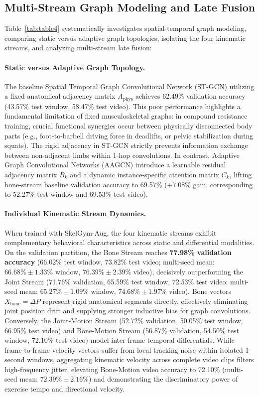 \documentclass[runningheads]{llncs}
\begin{document}
\subsection{Multi-Stream Graph Modeling and Late Fusion}
Table~\ref{tab:table4} systematically investigates spatial-temporal graph modeling, comparing static versus adaptive graph topologies, isolating the four kinematic streams, and analyzing multi-stream late fusion:

\paragraph{Static versus Adaptive Graph Topology.} The baseline Spatial Temporal Graph Convolutional Network (ST-GCN) utilizing a fixed anatomical adjacency matrix $A_{\text{phys}}$ achieves 62.49\% validation accuracy (43.57\% test window, 58.47\% test video). This poor performance highlights a fundamental limitation of fixed musculoskeletal graphs: in compound resistance training, crucial functional synergies occur between physically disconnected body parts (e.g., foot-to-barbell driving force in deadlifts, or pelvic stabilization during squats). The rigid adjacency in ST-GCN strictly prevents information exchange between non-adjacent limbs within 1-hop convolutions. In contrast, Adaptive Graph Convolutional Networks (AAGCN) introduce a learnable residual adjacency matrix $B_k$ and a dynamic instance-specific attention matrix $C_k$, lifting bone-stream baseline validation accuracy to 69.57\% (+7.08\% gain, corresponding to 52.27\% test window and 69.53\% test video).

\paragraph{Individual Kinematic Stream Dynamics.} When trained with SkelGym-Aug, the four kinematic streams exhibit complementary behavioral characteristics across static and differential modalities. On the validation partition, the Bone Stream reaches \textbf{77.98\% validation accuracy} (66.02\% test window, 73.82\% test video; multi-seed mean: $66.68\% \pm 1.33\%$ window, $76.39\% \pm 2.39\%$ video), decisively outperforming the Joint Stream (71.76\% validation, 65.59\% test window, 72.53\% test video; multi-seed mean: $65.27\% \pm 1.09\%$ window, $74.68\% \pm 1.97\%$ video). Bone vectors $X_{\text{bone}} = \Delta P$ represent rigid anatomical segments directly, effectively eliminating joint position drift and supplying stronger inductive bias for graph convolutions. Conversely, the Joint-Motion Stream (52.72\% validation, 50.05\% test window, 66.95\% test video) and Bone-Motion Stream (56.87\% validation, 54.50\% test window, 72.10\% test video) model inter-frame temporal differentials. While frame-to-frame velocity vectors suffer from local tracking noise within isolated 1-second windows, aggregating kinematic velocity across complete video clips filters high-frequency jitter, elevating Bone-Motion video accuracy to 72.10\% (multi-seed mean: $72.39\% \pm 2.16\%$) and demonstrating the discriminatory power of exercise tempo and directional velocity.
\end{document}
